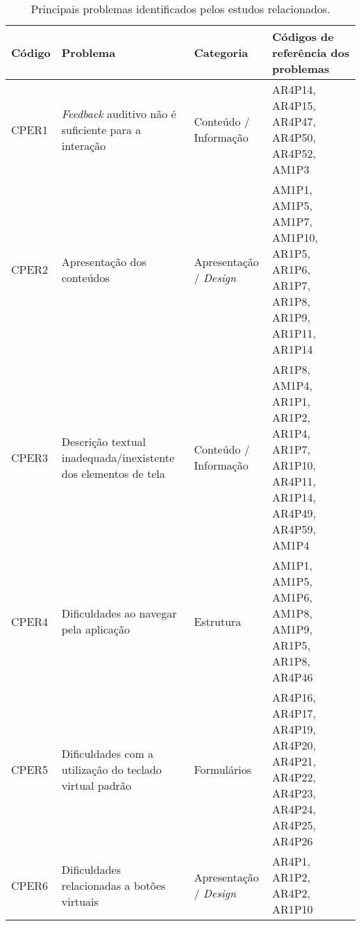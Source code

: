 \begin{table}[htb]
    \begin{center}
        \ABNTEXfontereduzida
        \caption{Principais problemas identificados pelos estudos relacionados.}
        \label{tab-pro-est-rel-1}
        \begin{tabular}{p{1.1cm}|p{4.0cm}|p{2.4cm}|p{6.7cm}}
            \textbf{Código} & \textbf{Problema}                                              & \textbf{Categoria}           & \textbf{Códigos de referência dos problemas}                                                                                                           \\
            \hline
            CPER1           & \emph{Feedback} auditivo não é suficiente para a interação     & Conteúdo / Informação        & AR4P14, AR4P15, AR4P47, AR4P50, AR4P52, AM1P3                                                                                                          \\
            \hline
            CPER2           & Apresentação dos conteúdos                                     & Apresentação / \emph{Design} & AM1P1, AM1P5, AM1P7, AM1P10, AR1P5, AR1P6, AR1P7, AR1P8, AR1P9, AR1P11, AR1P14                                                                         \\
            \hline
            CPER3           & Descrição textual inadequada/inexistente dos elementos de tela & Conteúdo / Informação        & AR1P8, AM1P4, AR1P1, AR1P2, AR1P4, AR1P7, AR1P10, AR4P11, AR1P14, AR4P49, AR4P59, AM1P4                                                                \\
            \hline
            CPER4           & Dificuldades ao navegar pela aplicação                         & Estrutura                    & AM1P1, AM1P5, AM1P6, AM1P8, AM1P9, AR1P5, AR1P8, AR4P46                                                                                                \\
            \hline
            CPER5           & Dificuldades com a utilização do teclado virtual padrão        & Formulários                  & AR4P16, AR4P17, AR4P19, AR4P20, AR4P21, AR4P22, AR4P23, AR4P24, AR4P25, AR4P26                                                                         \\
            \hline
            CPER6           & Dificuldades relacionadas a botões virtuais                    & Apresentação / \emph{Design} & AR4P1, AR1P2, AR4P2, AR1P10                                                                                                                            \\

\end{tabular}
\end{center}
\end{table}
